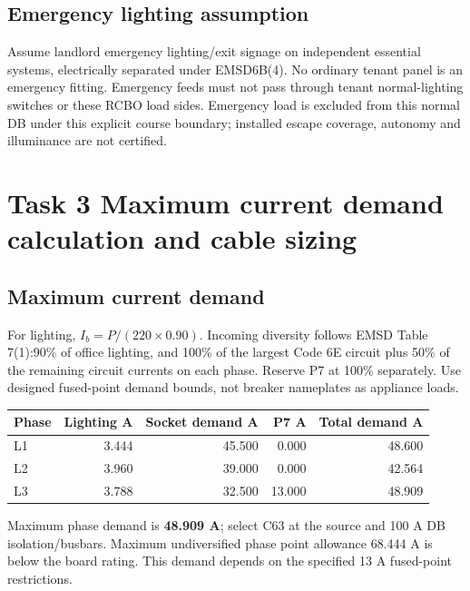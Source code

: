 \documentclass[11pt,a4paper]{article}
\newcommand{\task}[1]{\clearpage\section*{#1}}
\begin{document}
\subsection*{Emergency lighting assumption}
Assume landlord emergency lighting/exit signage on independent essential systems, electrically separated under EMSD6B(4). No ordinary tenant panel is an emergency fitting. Emergency feeds must not pass through tenant normal-lighting switches or these RCBO load sides. Emergency load is excluded from this normal DB under this explicit course boundary;  installed escape coverage, autonomy and illuminance are not certified.
\task{Task 3 Maximum current demand calculation and cable sizing}
\subsection*{Maximum current demand}
For lighting, $I_b=P/(220\times 0.90)$. Incoming diversity follows EMSD Table 7(1):90\% of office lighting, and 100\% of the largest Code 6E circuit plus 50\% of the remaining circuit currents on each phase. Reserve P7 at 100\% separately. Use designed fused-point demand bounds, not breaker nameplates as appliance loads.
\begin{center}\begin{tabular}{lrrrr}\toprule
Phase & Lighting A & Socket demand A & P7 A & Total demand A\\\midrule

L1 & 3.444 & 45.500 & 0.000 & 48.600 \\
L2 & 3.960 & 39.000 & 0.000 & 42.564 \\
L3 & 3.788 & 32.500 & 13.000 & 48.909 \\

\bottomrule\end{tabular}\end{center}
Maximum phase demand is \textbf{48.909 A};  select C63 at the source and 100 A DB isolation/busbars. Maximum undiversified phase point allowance 68.444 A is below the board rating. This demand depends on the specified 13 A fused-point restrictions.
\end{document}
